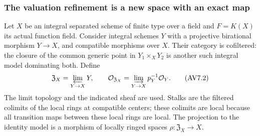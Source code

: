 \documentclass[11pt,a4paper]{article}
\theoremstyle{definition}\newtheorem{definition}[theorem]{Definition}
\begin{document}
\subsubsection{The valuation refinement is a new space with an exact map}

Let $X$ be an integral separated scheme of finite type over a field and
$F=K(X)$ its actual function field. Consider integral schemes $Y$ with
a projective birational morphism $Y\to X$, and compatible morphisms
over $X$. Their category is cofiltered: the closure of the common
generic point in $Y_1\times_XY_2$ is another such integral model
dominating both. Define
\[
 \mathfrak Z_X=\varprojlim_{Y\to X}Y,\qquad
 \mathcal O_{\mathfrak Z_X}
   =\varinjlim_{Y\to X}p_Y^{-1}\mathcal O_Y.
 \tag{AV7.2}\label{eq:valuation-refinement}
\]
The limit topology and the indicated sheaf are used. Stalks are the
filtered colimits of the local rings at compatible centers; these
colimits are local because all transition maps between these local
rings are local. The projection to the identity model is a morphism of
locally ringed spaces $\rho:\mathfrak Z_X\to X$.
\end{document}
